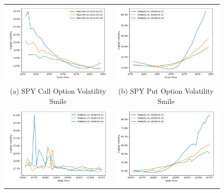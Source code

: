 \documentclass[10pt]{article}
\begin{document}
        \begin{figure}[!hb] %
            \begin{tabular}{|c|c|}
                \hline
                \includegraphics[width=.47\textwidth]{bin/vol_smile/SPY_Call_2DVolSmile.png} &
                \includegraphics[width=.47\textwidth]{bin/vol_smile/SPY_Put_2DVolSmile.png} \\
                (a) SPY Call Option Volatility Smile &
                (b) SPY Put Option Volatility Smile \\
                \hline
                \includegraphics[width=.47\textwidth]{bin/vol_smile/AMZN_Call_2DVolSmile.png} &
                \includegraphics[width=.47\textwidth]{bin/vol_smile/AMZN_Put_2DVolSmile.png} \\

\end{tabular}
\end{figure}
\end{document}
